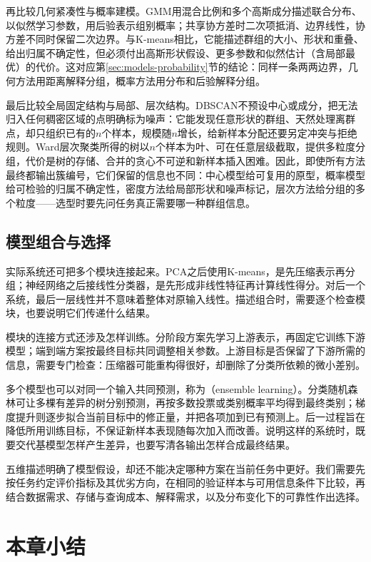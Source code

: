 再比较几何紧凑性与概率建模。GMM用混合比例和多个高斯成分描述联合分布、以似然学习参数，用后验表示组别概率；共享协方差时二次项抵消、边界线性，协方差不同时保留二次边界。与K-means相比，它能描述群组的大小、形状和重叠、给出归属不确定性，但必须付出高斯形状假设、更多参数和似然估计（含局部最优）的代价。这对应第\ref{sec:models-probability}节的结论：同样一条两两边界，几何方法用距离解释分组，概率方法用分布和后验解释分组。

最后比较全局固定结构与局部、层次结构。DBSCAN不预设中心或成分，把无法归入任何稠密区域的点明确标为噪声：它能发现任意形状的群组、天然处理离群点，却只组织已有的$n$个样本，规模随$n$增长，给新样本分配还要另定冲突与拒绝规则。Ward层次聚类所得的树以$n$个样本为叶、可在任意层级截取，提供多粒度分组，代价是树的存储、合并的贪心不可逆和新样本插入困难。因此，即使所有方法最终都输出簇编号，它们保留的信息也不同：中心模型给可复用的原型，概率模型给可检验的归属不确定性，密度方法给局部形状和噪声标记，层次方法给分组的多个粒度——选型时要先问任务真正需要哪一种群组信息。

\subsection{模型组合与选择}
\label{sec:models-combination-selection}

实际系统还可把多个模块连接起来。PCA之后使用K-means，是先压缩表示再分组；神经网络之后接线性分类器，是先形成非线性特征再计算线性得分。对后一个系统，最后一层线性并不意味着整体对原输入线性。描述组合时，需要逐个检查模块，也要说明它们传递什么结果。

模块的连接方式还涉及怎样训练。分阶段方案先学习上游表示，再固定它训练下游模型；端到端方案按最终目标共同调整相关参数。上游目标是否保留了下游所需的信息，需要专门检查：压缩器可能重构得很好，却删除了分类所依赖的微小差别。

多个模型也可以对同一个输入共同预测，称为（ensemble learning）。分类随机森林可让多棵有差异的树分别预测，再按多数投票或类别概率平均得到最终类别；梯度提升则逐步拟合当前目标中的修正量，并把各项加到已有预测上。后一过程旨在降低所用训练目标，不保证新样本表现随每次加入而改善。说明这样的系统时，既要交代基模型怎样产生差异，也要写清各输出怎样合成最终结果。

五维描述明确了模型假设，却还不能决定哪种方案在当前任务中更好。我们需要先按任务约定评价指标及其优劣方向，在相同的验证样本与可用信息条件下比较，再结合数据需求、存储与查询成本、解释需求，以及分布变化下的可靠性作出选择。

\section{本章小结}
\label{sec:models-summary}

